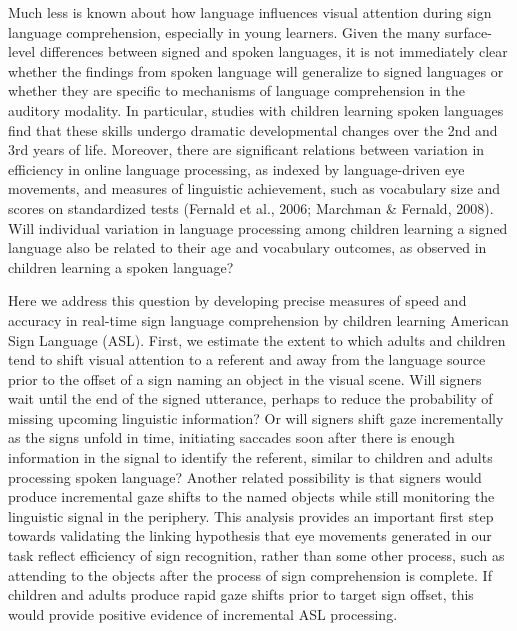 \documentclass[oneside]{report}
\begin{document}
Much less is known about how language influences visual attention during
sign language comprehension, especially in young learners. Given the
many surface-level differences between signed and spoken languages, it
is not immediately clear whether the findings from spoken language will
generalize to signed languages or whether they are specific to
mechanisms of language comprehension in the auditory modality. In
particular, studies with children learning spoken languages find that
these skills undergo dramatic developmental changes over the 2nd and 3rd
years of life. Moreover, there are significant relations between
variation in efficiency in online language processing, as indexed by
language-driven eye movements, and measures of linguistic achievement,
such as vocabulary size and scores on standardized tests (Fernald et
al., 2006; Marchman \& Fernald, 2008). Will individual variation in
language processing among children learning a signed language also be
related to their age and vocabulary outcomes, as observed in children
learning a spoken language?

Here we address this question by developing precise measures of speed
and accuracy in real-time sign language comprehension by children
learning American Sign Language (ASL). First, we estimate the extent to
which adults and children tend to shift visual attention to a referent
and away from the language source prior to the offset of a sign naming
an object in the visual scene. Will signers wait until the end of the
signed utterance, perhaps to reduce the probability of missing upcoming
linguistic information? Or will signers shift gaze incrementally as the
signs unfold in time, initiating saccades soon after there is enough
information in the signal to identify the referent, similar to children
and adults processing spoken language? Another related possibility is
that signers would produce incremental gaze shifts to the named objects
while still monitoring the linguistic signal in the periphery. This
analysis provides an important first step towards validating the linking
hypothesis that eye movements generated in our task reflect efficiency
of sign recognition, rather than some other process, such as attending
to the objects after the process of sign comprehension is complete. If
children and adults produce rapid gaze shifts prior to target sign
offset, this would provide positive evidence of incremental ASL
processing.
\end{document}
